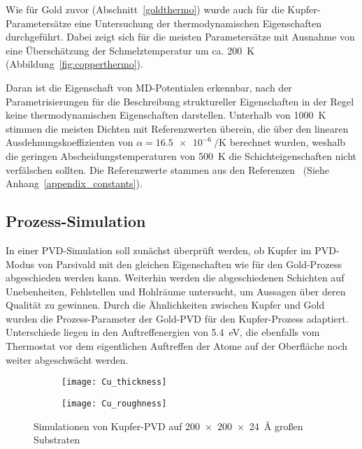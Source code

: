 Wie für Gold zuvor (Abschnitt~\ref{goldthermo}) wurde auch für die Kupfer-Parametersätze eine Untersuchung der thermodynamischen Eigenschaften durchgeführt.
Dabei zeigt sich für die meisten Parametersätze mit Ausnahme von  eine Überschätzung der Schmelztemperatur um ca. \SI{200}{\kelvin} (Abbildung~\ref{fig:copperthermo}).

Daran ist die Eigenschaft von MD-Potentialen erkennbar, nach der Parametrisierungen für die Beschreibung struktureller Eigenschaften in der Regel keine thermodynamischen Eigenschaften darstellen.
Unterhalb von \SI{1000}{\kelvin} stimmen die meisten Dichten mit Referenzwerten überein, die über den linearen Ausdehnungskoeffizienten von $\alpha = \SI{16.5e-6}{\per\kelvin}$\cite{haynes_crc_2011} berechnet wurden, weshalb die geringen Abscheidungstemperaturen von \SI{500}{\kelvin} die Schichteigenschaften nicht verfälschen sollten.
Die Referenzwerte stammen aus den Referenzen~\cite{haynes_crc_2011,brillo_density_2006} (Siehe Anhang~\ref{appendix_constants}).

\subsection{Prozess-Simulation}
\label{coppersimulation}

In einer PVD-Simulation soll zunächst überprüft werden, ob Kupfer im PVD-Modus von Parsivald mit den gleichen Eigenschaften wie für den Gold-Prozess abgeschieden werden kann.
Weiterhin werden die abgeschiedenen Schichten auf Unebenheiten, Fehlstellen und Hohlräume untersucht, um Aussagen über deren Qualität zu gewinnen.
Durch die Ähnlichkeiten zwischen Kupfer und Gold wurden die Prozess-Parameter der Gold-PVD für den Kupfer-Prozess adaptiert.
Unterschiede liegen in den Auftreffenergien von \SI{5.4}{\electronvolt}, die ebenfalls vom Thermostat vor dem eigentlichen Auftreffen der Atome auf der Oberfläche noch weiter abgeschwächt werden.

\begin{figure}[b]
  \captionsetup[subfigure]{singlelinecheck=false}
  \def\subfigwidth{0.49\textwidth}
  \begin{subfigure}[t]{\subfigwidth}
    \texttt{[image: Cu\_thickness]}
    \label{fig:copperparsivald-a}
  \end{subfigure}
  \hfill
  \begin{subfigure}[t]{\subfigwidth}
    \texttt{[image: Cu\_roughness]}
    \label{fig:copperparsivald-b}
  \end{subfigure}
  \caption{Simulationen von Kupfer-PVD auf \SI{200x200x24}{\angstrom} großen Substraten}
  \label{fig:copperparsivald}
\end{figure}

